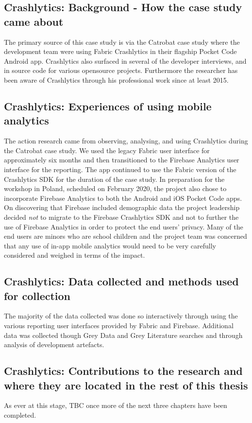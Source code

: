 \subsection{Crashlytics: Background - How the case study came about}
The primary source of this case study is via the Catrobat case study where the development team were using Fabric Crashlytics in their flagship Pocket Code Android app. Crashlytics also surfaced in several of the developer interviews, and in source code for various opensource projects. Furthermore the researcher has been aware of Crashlytics through his professional work since at least 2015.

\subsection{Crashlytics: Experiences of using mobile analytics}
The action research came from observing, analysing, and using Crashlytics during the Catrobat case study. We used the legacy Fabric user interface for approximately six months and then transitioned to the Firebase Analytics user interface for the reporting. The app continued to use the Fabric version of the Crashlytics SDK for the duration of the case study. In preparation for the workshop in Poland, scheduled on  February 2020, the project also chose to incorporate Firebase Analytics to both the Android and iOS Pocket Code apps. On discovering that Firebase included demographic data the project leadership decided \emph{not} to migrate to the Firebase Crashlytics SDK and not to further the use of Firebase Analytics in order to protect the end users' privacy. Many of the end users are minors who are school children and the project team was concerned that any use of in-app mobile analytics would need to be very carefully considered and weighed in terms of the impact.

\subsection{Crashlytics: Data collected and methods used for collection}
The majority of the data collected was done so interactively through using the various reporting user interfaces provided by Fabric and Firebase. Additional data was collected though Grey Data and Grey Literature searches and through analysis of development artefacts.

\subsection{Crashlytics: Contributions to the research and where they are located in the rest of this thesis}
As ever at this stage, TBC once more of the next three chapters have been completed.


